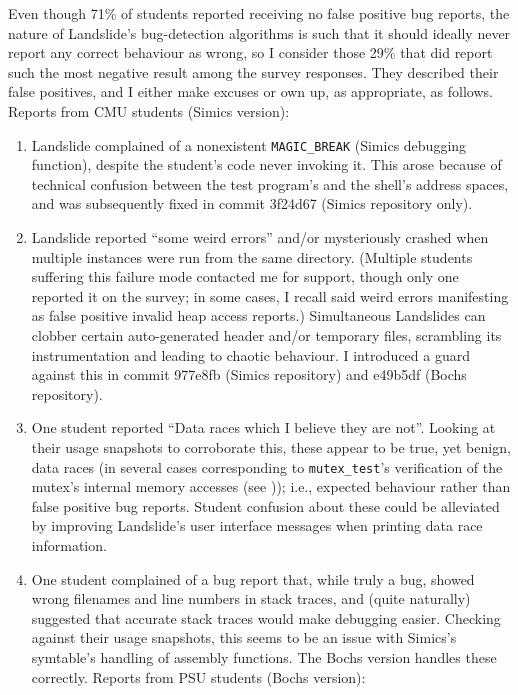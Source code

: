 Even though 71\% of students reported receiving no false positive bug reports,
the nature of Landslide's bug-detection algorithms is such
that it should ideally never report any correct behaviour as wrong,
so I consider those 29\% that did report such the most negative result among the survey responses.
They described their false positives, and I either make excuses or own up, as appropriate, as follows.
Reports from CMU students (Simics version):
\begin{enumerate}
	\item Landslide complained of a nonexistent {\tt MAGIC\_BREAK} (Simics debugging function),
		despite the student's code never invoking it.
		This arose because of technical confusion between the test program's and the shell's address spaces,
		and was subsequently fixed in commit 3f24d67 (Simics repository only).
	\item Landslide reported ``some weird errors'' and/or mysteriously crashed
		when multiple instances were run from the same directory.
		(Multiple students suffering this failure mode contacted me for support,
		though only one reported it on the survey;
		in some cases, I recall said weird errors manifesting as false positive invalid heap access reports.)
		Simultaneous Landslides can clobber certain auto-generated header and/or temporary files,
		scrambling its instrumentation and leading to chaotic behaviour.
		I introduced a guard against this in commit 977e8fb (Simics repository) and e49b5df (Bochs repository).
	\item One student reported ``Data races which I believe they are not''.
		Looking at their usage snapshots to corroborate this,
		these appear to be true, yet benign, data races
		(in several cases corresponding to {\tt mutex\_test}'s verification of the mutex's internal memory accesses
		(see \sect{\ref{sec:education-pebbles-tests}}));
		i.e., expected behaviour rather than false positive bug reports.
		Student confusion about these could be alleviated
		by improving Landslide's user interface messages when printing data race information. %
	\item One student complained of a bug report that, while truly a bug, showed wrong filenames and line numbers in stack traces,
		and (quite naturally) suggested that accurate stack traces would make debugging easier.
		Checking against their usage snapshots,
		this seems to be an issue with Simics's symtable's handling of assembly functions.
		The Bochs version handles these correctly.
Reports from PSU students (Bochs version):

\end{enumerate}
